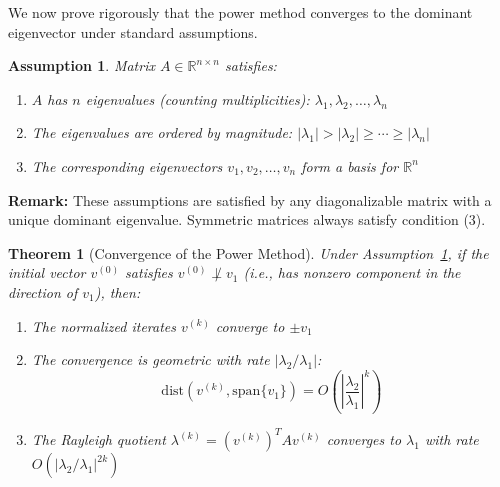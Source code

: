 \documentclass[11pt,a4paper]{article}
\newtheorem{theorem}{Theorem}
\newtheorem{assumption}{Assumption}
\begin{document}
We now prove rigorously that the power method converges to the dominant eigenvector under standard assumptions.

\begin{assumption}
\label{ass:main}
Matrix $A \in \mathbb{R}^{n \times n}$ satisfies:
\begin{enumerate}
    \item $A$ has $n$ eigenvalues (counting multiplicities): $\lambda_1, \lambda_2, \ldots, \lambda_n$
    \item The eigenvalues are ordered by magnitude: $|\lambda_1| > |\lambda_2| \geq \cdots \geq |\lambda_n|$
    \item The corresponding eigenvectors $v_1, v_2, \ldots, v_n$ form a basis for $\mathbb{R}^n$
\end{enumerate}
\end{assumption}

\textbf{Remark:} These assumptions are satisfied by any diagonalizable matrix with a unique dominant eigenvalue. Symmetric matrices always satisfy condition (3).

\begin{theorem}[Convergence of the Power Method]
\label{thm:convergence}
Under Assumption~\ref{ass:main}, if the initial vector $v^{(0)}$ satisfies $v^{(0)} \not\perp v_1$ (i.e., has nonzero component in the direction of $v_1$), then:
\begin{enumerate}
    \item The normalized iterates $v^{(k)}$ converge to $\pm v_1$
    \item The convergence is geometric with rate $|\lambda_2/\lambda_1|$:
    $$\text{dist}(v^{(k)}, \text{span}\{v_1\}) = O\left(\left|\frac{\lambda_2}{\lambda_1}\right|^k\right)$$
    \item The Rayleigh quotient $\lambda^{(k)} = (v^{(k)})^T A v^{(k)}$ converges to $\lambda_1$ with rate $O(|\lambda_2/\lambda_1|^{2k})$
\end{enumerate}
\end{theorem}
\end{document}
